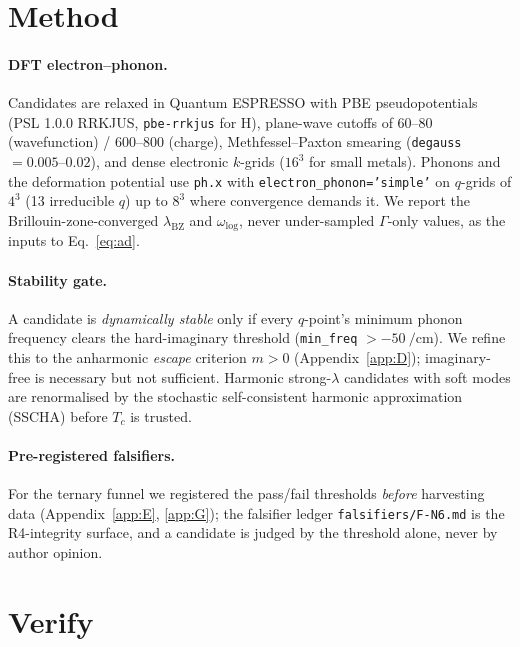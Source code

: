 \documentclass[11pt,a4paper]{article}
\begin{document}
\section{Method}
\label{sec:method}

\paragraph{DFT electron--phonon.}
Candidates are relaxed in Quantum ESPRESSO with PBE pseudopotentials (PSL
1.0.0 RRKJUS, \texttt{pbe-rrkjus} for H), plane-wave cutoffs of
\SIrange{60}{80}{\rydberg} (wavefunction) / \SIrange{600}{800}{\rydberg}
(charge), Methfessel--Paxton smearing
(\texttt{degauss}\,$=\numrange{0.005}{0.02}$), and dense electronic
$k$-grids ($16^3$ for small metals). Phonons and the deformation potential
use \texttt{ph.x} with \texttt{electron\_phonon='simple'} on $q$-grids of
$4^3$ (13 irreducible $q$) up to $8^3$ where convergence demands it. We
report the Brillouin-zone-converged $\lambda_{\mathrm{BZ}}$ and
$\omega_{\log}$, never under-sampled $\Gamma$-only values, as the inputs to
Eq.~\eqref{eq:ad}.

\paragraph{Stability gate.}
A candidate is \emph{dynamically stable} only if every $q$-point's minimum
phonon frequency clears the hard-imaginary threshold (\texttt{min\_freq}
$> -\SI{50}{\per\centi\meter}$). We refine this to the anharmonic
\emph{escape} criterion $m > 0$ (Appendix~\ref{app:D}); imaginary-free is
necessary but not sufficient. Harmonic strong-$\lambda$ candidates with soft
modes are renormalised by the stochastic self-consistent harmonic
approximation (SSCHA) before $T_c$ is trusted.

\paragraph{Pre-registered falsifiers.}
For the ternary funnel we registered the pass/fail thresholds \emph{before}
harvesting data (Appendix~\ref{app:E}, \ref{app:G}); the falsifier ledger
\texttt{falsifiers/F-N6.md} is the R4-integrity surface, and a candidate is
judged by the threshold alone, never by author opinion.

\section{Verify}
\label{sec:verify}
\end{document}
